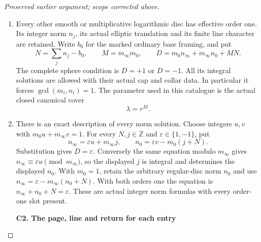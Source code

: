 \begin{proof}[Preserved earlier argument; scope corrected above]
\begin{enumerate}[label=\arabic*.]
\item Every other smooth or multiplicative logarithmic disc has
effective order one. Its integer norm \(n_j\), its actual
elliptic translation and its finite line character are
retained. Write \(b_0\) for the marked ordinary base framing,
and put
\[
 N=\sum_j n_j-b_0,\qquad
 M=m_\infty m_0,\qquad
 D=m_0n_\infty+m_\infty n_0+MN.                 \tag{SC.1}
\]
The complete sphere condition is \(D=+1\) or \(D=-1\).
All its integral solutions are allowed with their actual
cap and collar data. In particular it forces
\(\gcd(m_i,n_i)=1\). The parameter used in this catalogue is
the actual closed canonical cover
\[
                         \lambda=r^M.          \tag{SC.2}
\]

\item There is an exact description of every norm solution. Choose
integers \(u,v\) with \(m_0u+m_\infty v=1\). For every
\(N,j\in\mathbb Z\) and \(\varepsilon\in\{1,-1\}\), put
\[
 n_\infty=\varepsilon u+m_\infty j,\qquad
 n_0=\varepsilon v-m_0(j+N).
\]
Substitution gives \(D=\varepsilon\). Conversely the same
equation modulo \(m_\infty\) gives
\(n_\infty\equiv\varepsilon u\pmod {m_\infty}\), so the
displayed \(j\) is integral and determines the displayed
\(n_0\). With \(m_0=1\), retain the arbitrary regular-disc
norm \(n_0\) and use
\(n_\infty=\varepsilon-m_\infty(n_0+N)\).
With both orders one the equation is
\(n_\infty+n_0+N=\varepsilon\).
These are actual integer norm formulas with every
order-one slot present.

\par

\medskip\noindent\textbf{C2. The page, line and return for each entry}

\par\nobreak


\end{enumerate}
\end{proof}
